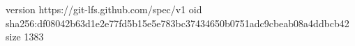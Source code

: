 version https://git-lfs.github.com/spec/v1
oid sha256:df08042b63d1e2e77fd5b15e5e783bc37434650b0751adc9cbeab08a4ddbcb42
size 1383
